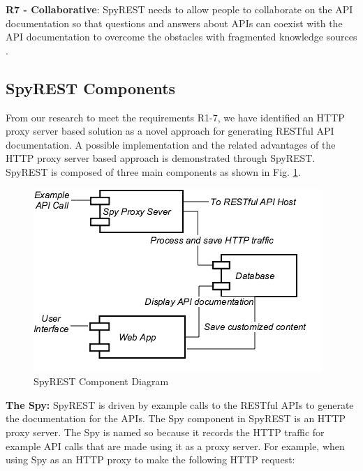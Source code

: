 \documentclass[conference]{IEEEtran}
\begin{document}
  \textbf{R7 - Collaborative}: SpyREST needs to allow people to collaborate on the API documentation so that questions and answers about APIs can coexist with the API documentation to overcome the obstacles with fragmented knowledge sources \cite{Chen_who_asked}.


\subsection{SpyREST Components} %
From our research to meet the requirements R1-7, we have identified an HTTP proxy server based solution as a novel approach for generating RESTful API documentation. A possible implementation and the related advantages of the HTTP proxy server based approach is demonstrated through SpyREST. SpyREST is composed of three main components as shown in Fig. \ref{fig:components}.

\begin{figure}[htb]
  \centering
  \includegraphics[width=\linewidth]{spyrest_components.png}
  \caption{SpyREST Component Diagram}
  \label{fig:components}
\end{figure}


% 

\textbf{The Spy:} SpyREST is driven by example calls to the RESTful APIs to generate the documentation for the APIs. The Spy component in SpyREST is an HTTP proxy server. The Spy is named so because it records the HTTP traffic for example API calls that are made using it as a proxy server. For example, when using Spy as an HTTP proxy to make the following HTTP request:
\end{document}
